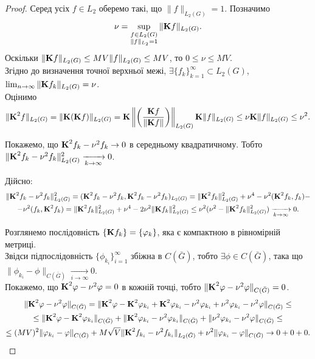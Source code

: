 \begin{proof}
	Серед усіх $f \in L_2$ оберемо такі, що $\|f\|_{L_2(G)} = 1$. Позначимо \[\nu = \Sup_{\substack{f \in L_2(G) \\ \|f\|_{L_2} = 1}} \|\bf{K} f\|_{L_2(G)}.\] Оскільки $\|\bf{K} f\|_{L_2(G)} \le MV \|f\|_{L_2(G)} \le MV$, то $0 \le \nu \le MV$. \\

	Згідно до визначення точної верхньої межі, $\exists \{ f_k \}_{k = 1}^\infty \subset L_2(G)$, $\lim_{n \to \infty} \|\bf{K} f_k\|_{L_2(G)} = \nu$. \\

	Оцінимо \[ \| \bf{K}^2 f\|_{L_2(G)} = \| \bf{K} (\bf{K} f)\|_{L_2(G)} = \bf{K} \left\| \left( \dfrac{\bf{K}f}{\|\bf{K}f\|}\right) \right\|_{L_2(G)} \bf{K} \|f\|_{L_2(G)} \le \nu \bf{K} \|f\|_{L_2(G)} \le \nu^2. \]
	
	Покажемо, що $\bf{K}^2 f_k - \nu^2 f_k \to 0$ в середньому квадратичному. Тобто $\| \bf{K}^2 f_k - \nu^2 f_k \|_{L_2(G)}^2 \xrightarrow[k \to \infty]{} 0$.

	Дійсно:
	\begin{multline*}
		\| \bf{K}^2 f_k - \nu^2 f_k \|_{L_2(G)}^2 = (\bf{K}^2 f_k - \nu^2 f_k, \bf{K}^2 f_k - \nu^2 f_k)_{L_2(G)} = \|\bf{K}^2 f_k\|_{L_2(G)}^2 + \nu^4 - \nu^2 (\bf{K}^2 f_k, f_k) - \\
		- \nu^2 (f_k, \bf{K}^2 f_k) = \|\bf{K}^2 f_k\|_{L_2(G)}^2 + \nu^4 - 2 \nu^2 \|\bf{K} f_k\|_{L_2(G)}^2 \le \nu^2 (\nu^2 - \|\bf{K}^2 f_k\|_{L_2(G)}^2) \xrightarrow[k\to\infty]{} 0.
	\end{multline*}

	Розглянемо послідовність $\{ \bf{K}f_k \} = \{ \phi_k\}$, яка є компактною в рівномірній метриці. \\

	Звідси підпослідовність $\{\phi_{k_i}\}_{i = 1}^\infty$ збіжна в $C(\bar G)$, тобто $\exists \phi \in C(\bar G)$, така що $\| \phi_{k_i} - \phi\|_{C(\bar G)} \xrightarrow[i \to \infty]{} 0$. \\

	Покажемо, що $\bf{K}^2 \phi - \nu^2 \phi = 0$ в кожній точці, тобто $\| \bf{K}^2\phi - \nu^2 \phi\|_{C(\bar G)} = 0$. 
	\begin{multline*}
		\|\bf{K}^2\phi-\nu^2\phi\|_{C(\bar G)} = \|\bf{K}^2\phi-\bf{K}^2\phi_{k_i}+\bf{K}^2\phi_{k_i}-\nu^2\phi_{k_i}+\nu^2\phi_{k_i}-\nu^2\phi\|_{C(\bar G)} \le \\
		\le \|\bf{K}^2\phi-\bf{K}^2\phi_{k_i}\|_{C(\bar G)} + \|\bf{K}^2\phi_{k_i}-\nu^2\phi_{k_i}\|_{C(\bar G)}+\|\nu^2\phi_{k_i}-\nu^2\phi\|_{C(\bar G)} \le \\
		\le (MV)^2 \|\phi_{k_i} - \phi\|_{C(\bar G)} + M\sqrt{V} \|\bf{K}^2f_{k_i}-\nu^2f_{k_i}\|_{L_2(\bar G)} + \nu^2 \|\phi_{k_i} - \phi\|_{C(\bar G)} \to 0 + 0 + 0.
	\end{multline*}
	

\end{proof}
